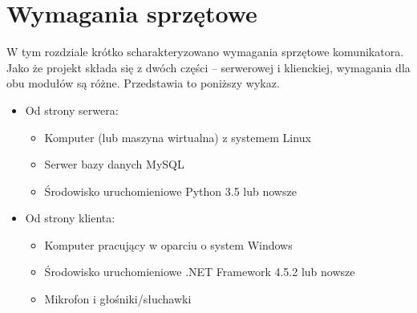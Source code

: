 \section{Wymagania sprzętowe}
W tym rozdziale krótko scharakteryzowano wymagania sprzętowe komunikatora. Jako że projekt składa się z dwóch części -- serwerowej i klienckiej, wymagania dla obu modułów są różne. Przedstawia to poniższy wykaz.
\begin{itemize}
\item Od strony serwera:
\begin{itemize}
	\item Komputer (lub maszyna wirtualna) z systemem Linux
	\item Serwer bazy danych MySQL
	\item Środowisko uruchomieniowe Python 3.5 lub nowsze
\end{itemize}
\item Od strony klienta:
\begin{itemize}
	\item Komputer pracujący w oparciu o system Windows 
	\item Środowisko uruchomieniowe .NET Framework 4.5.2 lub nowsze
	\item Mikrofon i głośniki/słuchawki 
\end{itemize}
\end{itemize}
